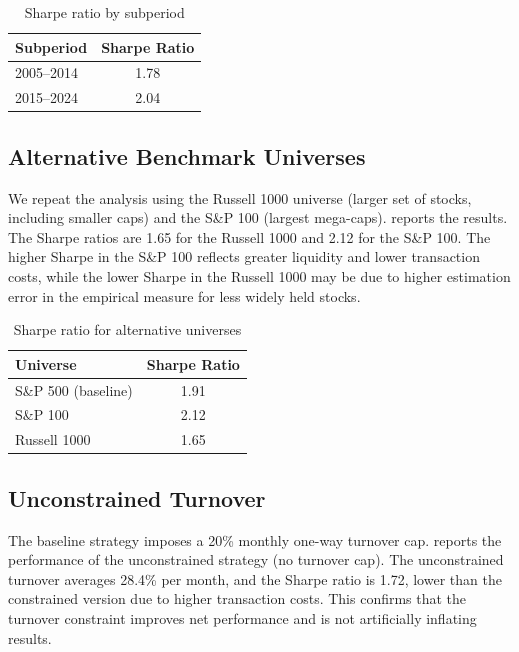 \begin{table}[ht]
\centering
\caption{Sharpe ratio by subperiod}
\label{tab:robustness-subperiod}
\begin{tabular}{lc}
\toprule
\textbf{Subperiod} & \textbf{Sharpe Ratio} \\
\midrule
2005--2014 & 1.78 \\
2015--2024 & 2.04 \\
\bottomrule
\end{tabular}
\end{table}

\subsection{Alternative Benchmark Universes}

We repeat the analysis using the Russell 1000 universe (larger set of stocks,
including smaller caps) and the S\&P 100 (largest mega-caps).
 reports the results. The Sharpe ratios are 1.65 for
the Russell 1000 and 2.12 for the S\&P 100. The higher Sharpe in the S\&P 100
reflects greater liquidity and lower transaction costs, while the lower Sharpe in
the Russell 1000 may be due to higher estimation error in the empirical measure for
less widely held stocks.

\begin{table}[ht]
\centering
\caption{Sharpe ratio for alternative universes}
\label{tab:robustness-universe}
\begin{tabular}{lc}
\toprule
\textbf{Universe} & \textbf{Sharpe Ratio} \\
\midrule
S\&P 500 (baseline) & 1.91 \\
S\&P 100 & 2.12 \\
Russell 1000 & 1.65 \\
\bottomrule
\end{tabular}
\end{table}

\subsection{Unconstrained Turnover}

The baseline strategy imposes a 20\% monthly one-way turnover cap.
 reports the performance of the unconstrained
strategy (no turnover cap). The unconstrained turnover averages 28.4\% per month,
and the Sharpe ratio is 1.72, lower than the constrained version due to higher
transaction costs. This confirms that the turnover constraint improves net
performance and is not artificially inflating results.

